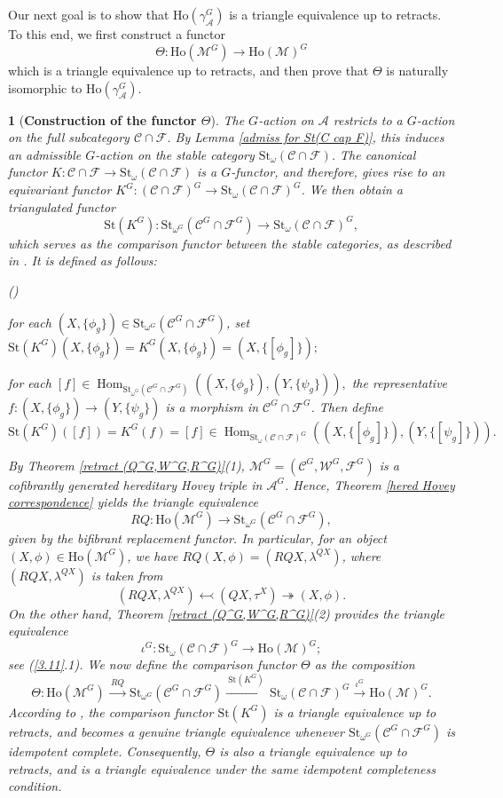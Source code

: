 \documentclass[12pt,twoside]{amsart}
\theoremstyle{bfupright head,slanted body}
\theoremstyle{bfupright head,upright body}
\newtheorem{bfhpg}[res]{}               \newtheorem*{bfhpg*}{}
\theoremstyle{fixed bf head,slanted body}
\theoremstyle{fixed bf head,upright body}
\theoremstyle{numbered paragraph}
\newlength{\thmlistleft}        %
\newlength{\thmlistright}       %
\newlength{\thmlistpartopsep}   %
\newlength{\thmlisttopsep}      %
\newlength{\thmlistparsep}      %
\newlength{\thmlistitemsep}     %
\newcounter{rqm}
\newenvironment{rqm}{\begin{list}{\upshape (\arabic{rqm})}%
    {\usecounter{rqm}%
      \setlength{\leftmargin}{\thmlistleft}%
      \setlength{\labelwidth}{\thmlistleft}%
      \setlength{\rightmargin}{\thmlistright}%
      \setlength{\partopsep}{\thmlistpartopsep}%
      \setlength{\topsep}{\thmlisttopsep}%
      \setlength{\parsep}{\thmlistparsep}%
      \setlength{\itemsep}{\thmlistitemsep}}}%
  {\end{list}}%
\newcommand{\thmcite}[2][?]{\cite[Theorem~#1]{#2}}
\numberwithin{equation}{res}
\newcommand{\calC}{\mathcal{C}}
\newcommand{\calW}{\mathcal{W}}
\newcommand{\calF}{\mathcal{F}}
\newcommand{\calA}{\mathcal{A}}
\newcommand{\calM}{\mathcal{M}}
\newcommand{\Ho}{\mathrm{Ho}}
\newcommand{\St}{\mathrm{St}}
\newcommand{\xra}[2][]{\xrightarrow[#1]{\:#2\:}}
\newcommand{\Hom}{\operatorname{Hom}}
\begin{document}
Our next goal is to show that \(\Ho(\gamma_{\calA}^G)\) is a triangle equivalence up to retracts. To this end, we first construct a functor
\[
\Theta:\Ho(\calM^G)\to\Ho(\calM)^G
\]
which is a triangle equivalence up to retracts, and then prove that \(\Theta\) is naturally isomorphic to \(\Ho(\gamma_{\calA}^G)\).

\begin{bfhpg}[\bf Construction of the functor $\Theta$] \label{con for Theta}
The $G$-action on $\calA$ restricts to a $G$-action on the full subcategory $\calC \cap \calF$.
By Lemma \ref{admiss for St(C cap F)}, this induces an admissible $G$-action on the stable category $\St_\omega(\calC \cap \calF)$.
The canonical functor $K: \calC \cap \calF \to \St_\omega(\calC \cap \calF)$ is a $G$-functor, and therefore, gives rise to an equivariant functor
$K^G: (\calC \cap \calF)^G \to \St_\omega(\calC \cap \calF)^G$.
We then obtain a triangulated functor
\[
\St(K^G) : \St_{\omega^G}(\calC^G \cap \calF^G) \to \St_\omega(\calC \cap \calF)^G,
\]
which serves as the comparison functor between the stable categories, as described in \thmcite[3.14]{2019Sun}.
It is defined as follows:
\begin{rqm}
\item[$\bullet$]
for each $(X, \{\phi_g\}) \in \St_{\omega^G}(\calC^G \cap \calF^G)$, set
$
\St(K^G)(X, \{\phi_g\}) = K^G(X, \{\phi_g\}) = (X, \{ [\phi_g] \});
$
\item[$\bullet$]
for each
$
[f] \in \Hom_{\St_{\omega^G}(\calC^G \cap \calF^G)}((X, \{\phi_g\}), (Y, \{\psi_g\})),
$
the representative $f : (X, \{\phi_g\}) \to (Y, \{\psi_g\})$ is a morphism in $\calC^G \cap \calF^G$.
Then define
\[
\St(K^G)([f]) = K^G(f) = [f] \in \Hom_{\St_\omega(\calC \cap \calF)^G}((X, \{[\phi_g]\}), (Y, \{[\psi_g]\})).
\]
\end{rqm}

By Theorem \ref{retract (Q^G,W^G,R^G)}(1), \(\calM^G=(\calC^G,\calW^G,\calF^G)\) is a cofibrantly generated hereditary Hovey triple in \(\calA^G\). Hence, Theorem \ref{hered Hovey correspondence} yields the triangle equivalence
\[
RQ:\Ho(\calM^G) \longrightarrow \St_{\omega^G}(\calC^G\cap\calF^G),
\]
given by the bifibrant replacement functor. In particular, for an object \((X,\phi)\in\Ho(\calM^G)\), we have \(RQ(X,\phi)=(RQX,\lambda^{QX})\), where \((RQX,\lambda^{QX})\) is taken from
\[
(RQX, \lambda^{QX}) \leftarrowtail  (QX, \tau^X) \twoheadrightarrow  (X, \phi).
\]
On the other hand, Theorem \ref{retract (Q^G,W^G,R^G)}(2) provides the triangle equivalence
\[
\iota^G:\St_\omega(\calC\cap\calF)^G \longrightarrow \Ho(\calM)^G;
\]
see (\ref{3.11}.1).
We now define the comparison functor \(\Theta\) as the composition
\[
\Theta:
\Ho(\calM^G)
\xra{RQ}
\St_{\omega^G}(\calC^G\cap\calF^G)
\xra{\St(K^G)}
\St_\omega(\calC\cap\calF)^G
\xra{\iota^G}
\Ho(\calM)^G.
\]
According to \thmcite[3.14]{2019Sun}, the comparison functor \(\St(K^G)\) is a triangle equivalence up to retracts, and becomes a genuine triangle equivalence whenever \(\St_{\omega^G}(\calC^G\cap\calF^G)\) is idempotent complete. Consequently, \(\Theta\) is also a triangle equivalence up to retracts, and is a triangle equivalence under the same idempotent completeness condition.
\end{bfhpg}
\end{document}
